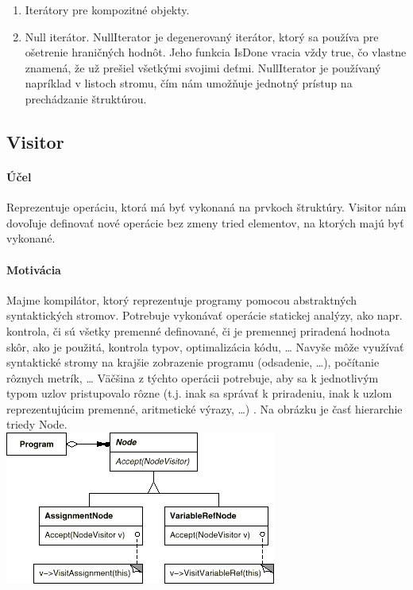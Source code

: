 \begin{enumerate}
				\item Iterátory pre kompozitné objekty.
				\item Null iterátor. NullIterator je degenerovaný iterátor, ktorý sa používa pre ošetrenie hraničných hodnôt. Jeho funkcia IsDone vracia vždy true, čo vlastne znamená, že už prešiel všetkými svojimi deťmi. NullIterator je používaný napríklad v listoch stromu, čím nám umožňuje jednotný prístup na prechádzanie štruktúrou.
			\end{enumerate}


	\subsection{Visitor}
		\paragraph{Účel}
			Reprezentuje operáciu, ktorá má byť vykonaná na prvkoch štruktúry. Visitor nám dovoľuje definovať nové operácie bez zmeny tried elementov, na ktorých majú byť vykonané.
		\paragraph{Motivácia}
		Majme kompilátor, ktorý reprezentuje programy pomocou abstraktných syntaktických stromov. Potrebuje vykonávať operácie statickej analýzy, ako napr. kontrola, či sú všetky premenné definované, či je premennej priradená hodnota skôr, ako je použitá, kontrola typov, optimalizácia kódu, … Navyše môže využívať syntaktické stromy na krajšie zobrazenie programu (odsadenie, …), počítanie rôznych metrík, … Väčšina z týchto operácii potrebuje, aby sa k jednotlivým typom uzlov pristupovalo rôzne (t.j. inak sa správať k priradeniu, inak k uzlom reprezentujúcim premenné, aritmetické výrazy, …) . Na obrázku je časť hierarchie triedy Node.\\


			\includegraphics[width=.7\textwidth]{images/visitor1}

